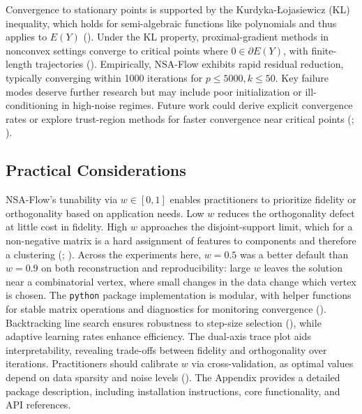\documentclass[
]{article}
\begin{document}
Convergence to stationary points is supported by the Kurdyka-Łojasiewicz (KL) inequality, which holds for semi-algebraic functions like polynomials and thus applies to \(E(Y)\) (). Under the KL property, proximal-gradient methods in nonconvex settings converge to critical points where \(0 \in \partial E(Y)\), with finite-length trajectories (). Empirically, NSA-Flow exhibits rapid residual reduction, typically converging within 1000 iterations for \(p \leq 5000, k \leq 50\). Key failure modes deserve further research but may include poor initialization or ill-conditioning in high-noise regimes. Future work could derive explicit convergence rates or explore trust-region methods for faster convergence near critical points (; ).

\subsection{Practical Considerations}\label{practical-considerations}

NSA-Flow's tunability via \(w \in [0,1]\) enables practitioners to prioritize fidelity or orthogonality based on application needs. Low \(w\) reduces the orthogonality defect at little cost in fidelity. High \(w\) approaches the disjoint-support limit, which for a non-negative matrix is a hard assignment of features to components and therefore a clustering (; ). Across the experiments here, \(w = 0.5\) was a better default than \(w = 0.9\) on both reconstruction and reproducibility: large \(w\) leaves the solution near a combinatorial vertex, where small changes in the data change which vertex is chosen. The \texttt{python} package implementation is modular, with helper functions for stable matrix operations and diagnostics for monitoring convergence (). Backtracking line search ensures robustness to step-size selection (), while adaptive learning rates enhance efficiency. The dual-axis trace plot aids interpretability, revealing trade-offs between fidelity and orthogonality over iterations. Practitioners should calibrate \(w\) via cross-validation, as optimal values depend on data sparsity and noise levels (). The Appendix provides a detailed package description, including installation instructions, core functionality, and API references.
\end{document}
